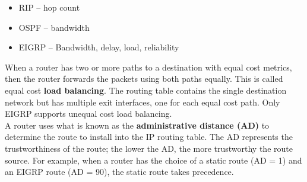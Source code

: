 \begin{itemize}
\item RIP -- hop count
\item OSPF -- bandwidth
\item EIGRP -- Bandwidth, delay, load, reliability
\end{itemize}

When a router has two or more paths to a destination with equal cost metrics, then the router forwards the packets using both paths equally. This is called equal cost \textbf{load balancing}. The routing table contains the single destination network but has multiple exit interfaces, one for each equal cost path. Only EIGRP supports unequal cost load balancing.\\

A router uses what is known as the \textbf{administrative distance (AD)} to determine the route to install into the IP routing table. The AD represents the trustworthiness of the route; the lower the AD, the more trustworthy the route source. For example, when a router has the choice of a static route (AD = 1) and an EIGRP route (AD = 90), the static route takes precedence. 